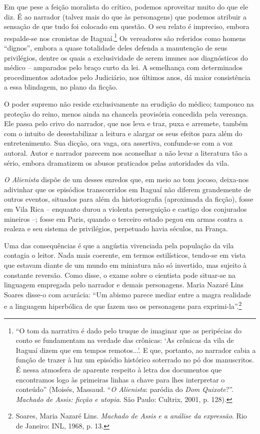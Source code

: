 Em que pese a feição moralista do crítico, podemos aproveitar muito do
que ele diz. É ao narrador (talvez mais do que às personagens) que
podemos atribuir a sensação de que tudo foi colocado em questão. O seu
relato é impreciso, embora respalde-se nos cronistas de
Itaguaí.\footnote{``O tom da narrativa é dado pelo truque de imaginar
  que as peripécias do conto se fundamentam na verdade das crônicas: `As
  crônicas da vila de Itaguaí dizem que em tempos remotos...'. E que,
  portanto, ao narrador cabia a função de trazer à luz um episódio
  histórico soterrado no pó dos manuscritos. É nessa atmosfera de
  aparente respeito à letra dos documentos que encontramos logo às
  primeiras linhas a chave para lhes interpretar o conteúdo''
  (Moisés, Massaud. ``\emph{O
  Alienista}: paródia do \emph{Dom Quixote}?''. \emph{Machado de Assis:
  ficção e utopia}. São Paulo: Cultrix, 2001, p. 128).} Os vereadores
são referidos como homens ``dignos'', embora a quase totalidade deles
defenda a manutenção de seus privilégios, dentre os quais a
exclusividade de serem imunes aos diagnósticos do médico -- amparados
pelo braço curto da lei. A semelhança com determinados procedimentos
adotados pelo Judiciário, nos últimos anos, dá maior consistência a essa
blindagem, no plano da ficção.

O poder supremo não reside exclusivamente na erudição do médico;
tampouco na proteção do reino, menos ainda na chancela provisória
concedida pela vereança. Ele passa pelo crivo do narrador, que nos leva
e traz, puxa e arremete, também com o intuito de desestabilizar a
leitura e alargar os seus efeitos para além do entretenimento. Sua
dicção, ora vaga, ora assertiva, confunde-se com a voz autoral. Autor e
narrador parecem nos aconselhar a não levar a literatura tão a sério,
embora dramatizem os abusos praticados pelas autoridades da vila.

\emph{O Alienista} dispõe de um desses enredos que, em meio ao tom
jocoso, deixa-nos adivinhar que os episódios transcorridos em Itaguaí
não diferem grandemente de outros eventos, situados para além da
historiografia (aproximada da ficção), fosse em Vila Rica -- enquanto
durou a violenta perseguição e castigo dos conjurados mineiros --; fosse
em Paris, quando o terceiro estado pegou em armas contra a realeza e seu
sistema de privilégios, perpetuado havia séculos, na França.

Uma das consequências é que a angústia vivenciada pela população da vila
contagia o leitor. Nada mais coerente, em termos estilísticos, tendo-se
em vista que estavam diante de um mundo em miniatura não só invertido,
mas sujeito à constante reversão. Como disse, o exame sobre o cientista
pode situar-se na linguagem empregada pelo narrador e demais
personagens. Maria Nazaré Lins Soares disse-o com acurácia: ``Um abismo
parece mediar entre a magra realidade e a linguagem hiperbólica de que
fazem uso os personagens para exprimi-la''.\footnote{Soares, Maria
  Nazaré Lins. \emph{Machado de Assis e a análise da expressão}. Rio de
  Janeiro: INL, 1968, p. 13.}

